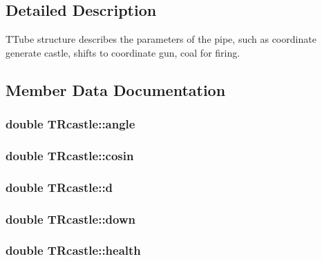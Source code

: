 \subsection{Detailed Description}
T\+Tube structure describes the parameters of the pipe, such as coordinate generate castle, shifts to coordinate gun, coal for firing. 

\subsection{Member Data Documentation}
\subsubsection[{\texorpdfstring{angle}{angle}}]{\setlength{\rightskip}{0pt plus 5cm}double T\+Rcastle\+::angle}\hypertarget{struct_t_rcastle_a2fd7be705bdd092f15e434666d793329}{}\label{struct_t_rcastle_a2fd7be705bdd092f15e434666d793329}
\subsubsection[{\texorpdfstring{cosin}{cosin}}]{\setlength{\rightskip}{0pt plus 5cm}double T\+Rcastle\+::cosin}\hypertarget{struct_t_rcastle_ad7002df0e24f1d7d6c36240ea4aac2a2}{}\label{struct_t_rcastle_ad7002df0e24f1d7d6c36240ea4aac2a2}
\subsubsection[{\texorpdfstring{d}{d}}]{\setlength{\rightskip}{0pt plus 5cm}double T\+Rcastle\+::d}\hypertarget{struct_t_rcastle_adaf3bf8d36b2d4115959858737f4d277}{}\label{struct_t_rcastle_adaf3bf8d36b2d4115959858737f4d277}
\subsubsection[{\texorpdfstring{down}{down}}]{\setlength{\rightskip}{0pt plus 5cm}double T\+Rcastle\+::down}\hypertarget{struct_t_rcastle_a6256c708f2b3e4114c0ebab3f388aede}{}\label{struct_t_rcastle_a6256c708f2b3e4114c0ebab3f388aede}
\subsubsection[{\texorpdfstring{health}{health}}]{\setlength{\rightskip}{0pt plus 5cm}double T\+Rcastle\+::health}\hypertarget{struct_t_rcastle_a8fc2c90a8127bac5ea539f14d6da4850}{}\label{struct_t_rcastle_a8fc2c90a8127bac5ea539f14d6da4850}
